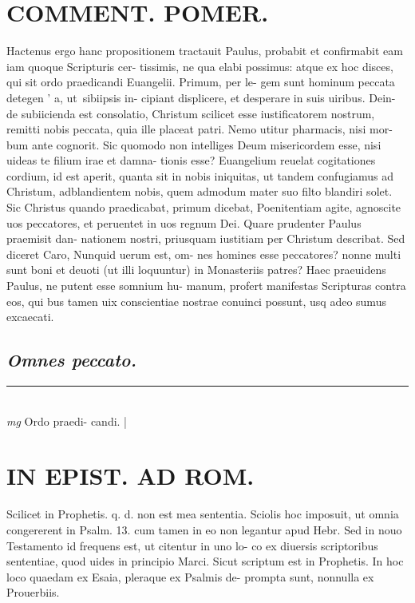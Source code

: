 \documentclass{article}
\begin{document}
\begin{pages}
\section*{COMMENT. POMER.  }\pstart Hactenus ergo hanc propositionem tractauit Paulus, probabit et confirmabit eam iam quoque Scripturis cer- tissimis, ne qua elabi possimus: atque ex hoc disces, qui sit ordo praedicandi Euangelii. Primum, per le- gem sunt hominum peccata detegen ' a, ut sibiipsis in- cipiant displicere, et desperare in suis uiribus. Dein- de subiicienda est consolatio, Christum scilicet esse iustificatorem nostrum, remitti nobis peccata, quia ille placeat patri. Nemo utitur pharmacis, nisi mor- bum ante cognorit. Sic quomodo non intelliges Deum misericordem esse, nisi uideas te filium irae et damna- tionis esse? Euangelium reuelat cogitationes cordium, id est aperit, quanta sit in nobis iniquitas, ut tandem confugiamus ad Christum, adblandientem nobis, quem admodum mater suo filto blandiri solet. Sic Christus quando praedicabat, primum dicebat, Poenitentiam agite, agnoscite uos peccatores, et peruentet in uos regnum Dei. Quare prudenter Paulus praemisit dan- nationem nostri, priusquam iustitiam per Christum describat. Sed diceret Caro, Nunquid uerum est, om- nes homines esse peccatores? nonne multi sunt boni et deuoti (ut illi loquuntur) in Monasteriis patres? Haec praeuidens Paulus, ne putent esse somnium hu- manum, profert manifestas Scripturas contra eos, qui bus tamen uix conscientiae nostrae conuinci possunt, usq adeo sumus excaecati.   \pend
{}
{}
\subsection*{\textit{Omnes peccato. }}\pstart  \pend
\vspace{0.5cm}\noindent
\vspace{0.2cm}\rule{1cm}{0.2pt}\\ 
\hspace{0.2cm}\textit{mg}
\footnotesize Ordo praedi- candi.  
\normalsize| 
\section*{IN EPIST. AD ROM.  }
\marginpar{[ p.19 ]}\pstart Scilicet in Prophetis. q. d. non est mea sententia.  Sciolis hoc imposuit, ut omnia congererent in Psalm.  13. cum tamen in eo non legantur apud Hebr. Sed in nouo Testamento id frequens est, ut citentur in uno lo- co ex diuersis scriptoribus sententiae, quod uides in principio Marci. Sicut scriptum est in Prophetis. In hoc loco quaedam ex Esaia, pleraque ex Psalmis de- prompta sunt, nonnulla ex Prouerbiis.   \pend
{}
{}

\end{pages}
\end{document}
